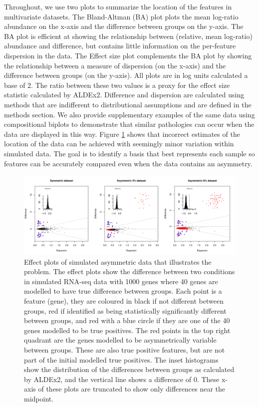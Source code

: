 \documentclass[10pt]{article}
\begin{document}
Throughout, we use two plots to summarize the location of the features in multivariate datasets. The Bland-Altman (BA) plot   plots the mean log-ratio abundance on the x-axis and the difference between groups on the y-axis. The BA plot is efficient at showing the relationship between (relative, mean log-ratio) abundance and difference, but contains little information on the per-feature dispersion in the data. The Effect size plot  complements the BA plot by showing the relationship between a measure of dispersion (on the x-axis) and the difference between groups (on the y-axis). All plots are in log units calculated a base of 2. The ratio between these two values is a proxy for the effect size statistic calculated by ALDEx2. Difference and dispersion are calculated using methods that are indifferent to distributional assumptions and are defined in the methods section. We also provide supplementary examples of the same data using compositional biplots  to demonstrate that similar pathologies can occur when the data are displayed in this way. Figure \ref{Fig:f1a} shows that incorrect estimates of the location of the data can be achieved with seemingly minor variation within simulated data. The goal is to identify a basis  that best represents each sample so features can be accurately compared even when the data contains an asymmetry.


\begin{figure}[ht]
\includegraphics[width=6in]{Fig_1.pdf}
\vspace{3mm} \caption{Effect plots  of simulated asymmetric data that illustrates the problem. The effect plots show the difference between two conditions in simulated RNA-seq data with 1000 genes where 40 genes are modelled to have true difference between groups. Each point is a feature (gene), they are coloured in black if not different between groups, red if identified as being statistically significantly different between groups, and red with a blue circle if they are one of the 40  genes modelled to be  true positives. The red points in the top right quadrant are the genes modelled to be asymmetrically variable between groups. These are also true positive features, but are not part of the initial modelled true positives. The inset histograms show the distribution of the differences between groups as calculated by ALDEx2, and the vertical line shows a difference of 0. These x-axis of these plots are truncated to show only differences near the midpoint.}
\label{Fig:f1a}
\end{figure}
\end{document}
